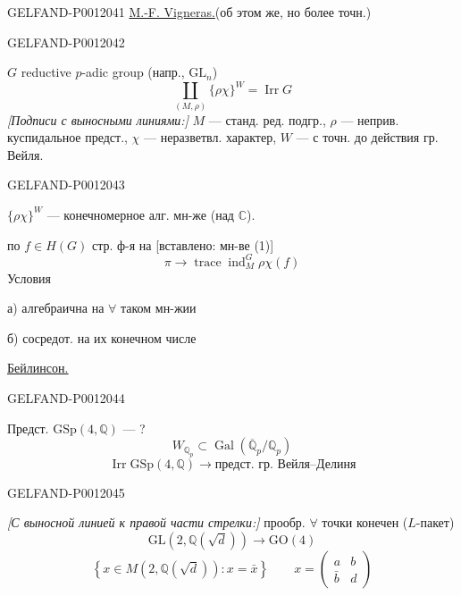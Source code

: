 \begin{GelfandAdjacentEvidence}{GELFAND-P001204}{1}
\underline{M.-F. Vigneras.}\quad (об этом же, но более точн.)
\end{GelfandAdjacentEvidence}
\begin{GelfandAdjacentEvidence}{GELFAND-P001204}{2}


\(G\) reductive \(p\)-adic group (напр., \(\mathrm{GL}_n\))
\begin{equation*}
\coprod_{(M,\rho)}\{\rho\chi\}^{W}=\operatorname{Irr}G \tag{1}
\end{equation*}
\textit{[Подписи с выносными линиями:]} \(M\) --- станд. ред. подгр.,
\(\rho\) --- неприв. куспидальное предст.,
\(\chi\) --- неразветвл. характер,
\(W\) --- с точн. до действия гр. Вейля.
\end{GelfandAdjacentEvidence}
\begin{GelfandAdjacentEvidence}{GELFAND-P001204}{3}


\(\{\rho\chi\}^{W}\) --- конечномерное алг. мн-же (\(\text{над }\mathbb C\)).

по \(f\in H(G)\) стр. ф-я на [вставлено: мн-ве (1)]
\[
\pi\longrightarrow\operatorname{trace}\operatorname{ind}_{M}^{G}\rho\chi(f)
\]
Условия

а) алгебраична на \(\forall\) таком мн-жии

б) сосредот. на их конечном числе

\underline{\underline{Бейлинсон.}}
\end{GelfandAdjacentEvidence}
\begin{GelfandAdjacentEvidence}{GELFAND-P001204}{4}


Предст. \(\mathrm{GSp}(4,\mathbb Q)\) --- ?
\[
W_{\mathbb Q_p}\subset\operatorname{Gal}(\overline{\mathbb Q}_p/\mathbb Q_p)
\]
\[
\operatorname{Irr}\mathrm{GSp}(4,\mathbb Q)
\longrightarrow \text{предст. гр. Вейля--Делиня}
\]
\end{GelfandAdjacentEvidence}
\begin{GelfandAdjacentEvidence}{GELFAND-P001204}{5}


\textit{[С выносной линией к правой части стрелки:]} прообр. \(\forall\) точки конечен (\(L\)-пакет)
\[
\mathrm{GL}(2,\mathbb Q(\sqrt d))\longrightarrow\mathrm{GO}(4)
\]
\[
\left\{x\in M(2,\mathbb Q(\sqrt d)):x=\bar x\right\}
\qquad
x=\begin{pmatrix}a&b\\\bar b&d\end{pmatrix}
\]
\end{GelfandAdjacentEvidence}
